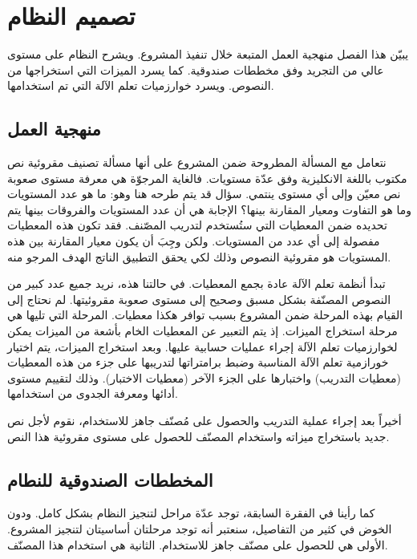 

\chapter{تصميم النظام}
يبيّن هذا الفصل منهجية العمل المتبعة خلال تنفيذ المشروع.
ويشرح النظام على مستوى عالي من التجريد وفق مخططات صندوقية.
كما يسرد الميزات التي استخراجها من النصوص.
ويسرد خوارزميات تعلم الآلة التي تم استخدامها.

\section{منهجية العمل}
\label{sec:sys:methedology}
نتعامل مع المسألة المطروحة ضمن المشروع على أنها مسألة تصنيف مقروئية نص مكتوب باللغة الانكليزية وفق عدّة مستويات.
فالغاية المرجوّة هي معرفة مستوى صعوبة نص معيّن وإلى أي مستوى ينتمي.
سؤال قد يتم طرحه هنا وهو: ما هو عدد المستويات وما هو التفاوت ومعيار المقارنة بينها؟
الإجابة هي أن عدد المستويات والفروقات بينها يتم تحديده ضمن المعطيات التي ستُستخدم لتدريب المصّنف.
فقد تكون هذه المعطيات مفصولة إلى أي عدد من المستويات.
ولكن وجِبَ أن يكون معيار المقارنة بين هذه المستويات هو مقروئية النصوص وذلك لكي يحقق التطبيق الناتج الهدف المرجو منه.

تبدأ أنظمة تعلم الآلة عادة بجمع المعطيات.
في حالتنا هذه، نريد جميع عدد كبير من النصوص المصنّفة بشكل مسبق وصحيح إلى مستوى صعوبة مقروئيتها.
لم نحتاج إلى القيام بهذه المرحلة ضمن المشروع بسبب توافر هكذا معطيات.
المرحلة التي تليها هي مرحلة استخراج الميزات.
إذ يتم التعبير عن المعطيات الخام بأشعة من الميزات يمكن لخوارزميات تعلم الآلة إجراء عمليات حسابية عليها.
وبعد استخراج الميزات، يتم اختيار خورازمية تعلم الآلة المناسبة وضبط برامتراتها 
لتدريبها على جزء من هذه المعطيات (معطيات التدريب) واختبارها على الجزء الآخر (معطيات الاختبار).
وذلك لتقييم مستوى أدائها ومعرفة الجدوى من استخدامها.

أخيراً بعد إجراء عملية التدريب والحصول على مُصنّف جاهز للاستخدام،
نقوم لأجل نص جديد باستخراج ميزاته واستخدام المصنّف للحصول على مستوى مقروئية هذا النص.


\section{المخططات الصندوقية للنطام}
كما رأينا في الفقرة السابقة، توجد عدّة مراحل لتنجيز النظام بشكل كامل.
ودون الخوض في كثير من التفاصيل، سنعتبر أنه توجد مرحلتان أساسيتان لتنجيز المشروع.
الأولى هي للحصول على مصنّف جاهز للاستخدام.
الثانية هي استخدام هذا المصنّف.

